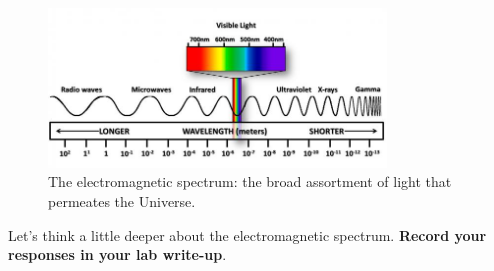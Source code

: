 \documentclass[11pt]{article}
\begin{document}
\begin{figure}
    \centering
    \includegraphics[width=0.8\textwidth]{Images/EM spectrum.jpg}
    \caption{The electromagnetic spectrum: the broad assortment of light that permeates the Universe.}
    \label{fig:spectrum}
\end{figure}
\medskip
\noindent
Let's think a little deeper about the electromagnetic spectrum. \textbf{Record your responses in your lab write-up}.
\end{document}
